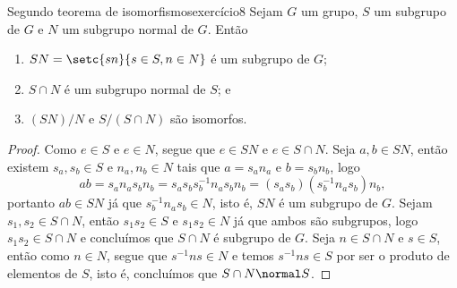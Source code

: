 \begin{proposition}{Segundo teorema de isomorfismos}{exercício8}
    Sejam \(G\) um grupo, \(S\) um subgrupo de \(G\) e \(N\) um subgrupo normal de \(G\). Então
    \begin{enumerate}[label=(\alph*)]
        \item \(SN = \setc{sn}{s \in S, n \in N}\) é um subgrupo de \(G\);
        \item \(S \cap N\) é um subgrupo normal de \(S\); e
        \item \((SN)/N\) e \(S/(S \cap N)\) são isomorfos.
    \end{enumerate}
\end{proposition}
\begin{proof}
    Como \(e \in S\) e \(e \in N\), segue que \(e \in SN\) e \(e \in S \cap N\). Seja \(a,b \in SN\), então existem \(s_a, s_b \in S\) e \(n_a, n_b \in N\) tais que \(a = s_a n_a\) e \(b = s_b n_b\), logo
    \begin{equation*}
        ab = s_a n_a s_b n_b = s_a s_b s_b^{-1} n_a s_b n_b = (s_a s_b) (s_b^{-1} n_a s_b) n_b,
    \end{equation*}
    portanto \(ab \in SN\) já que \(s_b^{-1} n_a s_b \in N\), isto é, \(SN\) é um subgrupo de \(G\). Sejam \(s_1, s_2 \in S\cap N\), então \(s_1 s_2 \in S\) e \(s_1 s_2 \in N\) já que ambos são subgrupos, logo \(s_1 s_2 \in S \cap N\) e concluímos que \(S\cap N\) é subgrupo de \(G\). Seja \(n \in S \cap N\) e \(s \in S\), então como \(n \in N\), segue que \(s^{-1}ns \in N\) e temos \(s^{-1} n s \in S\) por ser o produto de elementos de \(S\), isto é, concluímos que \(S \cap N \normal S\).


\end{proof}

